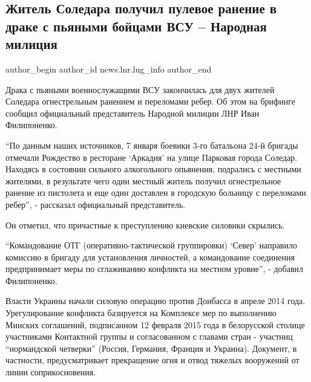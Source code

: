  
 
 
 
 
\subsection{Житель Соледара получил пулевое ранение в драке с пьяными бойцами ВСУ – Народная милиция}
\label{sec:09_01_2022.stz.news.lnr.lug_info.1.vsu_draka}

\ifcmt
 author_begin
   author_id news.lnr.lug_info
 author_end
\fi

Драка с пьяными военнослужащими ВСУ закончилась для двух жителей Соледара
огнестрельным ранением и переломами ребер. Об этом на брифинге сообщил
официальный представитель Народной милиции ЛНР Иван Филипоненко.

\enquote{По данным наших источников, 7 января боевики 3-го батальона 24-й
бригады отмечали Рождество в ресторане \enquote{Аркадия} на улице Парковая
города Соледар.  Находясь в состоянии сильного алкогольного опьянения,
подрались с местными жителями, в результате чего один местный житель получил
огнестрельное ранение из пистолета и еще один доставлен в городскую больницу с
переломами ребер}, - рассказал официальный представитель.

Он отметил, что причастные к преступлению киевские силовики скрылись.  

\enquote{Командование ОТГ (оперативно-тактической группировки) \enquote{Север}
направило комиссию в бригаду для установления личностей, а командование
соединения предпринимает меры по сглаживанию конфликта на местном уровне}, -
добавил Филипоненко.

Власти Украины начали силовую операцию против Донбасса в апреле 2014 года.
Урегулирование конфликта базируется на Комплексе мер по выполнению Минских
соглашений, подписанном 12 февраля 2015 года в белорусской столице участниками
Контактной группы и согласованном с главами стран - участниц
\enquote{нормандской четверки} (Россия, Германия, Франция и Украина). Документ,
в частности, предусматривает прекращение огня и отвод тяжелых вооружений от
линии соприкосновения.
